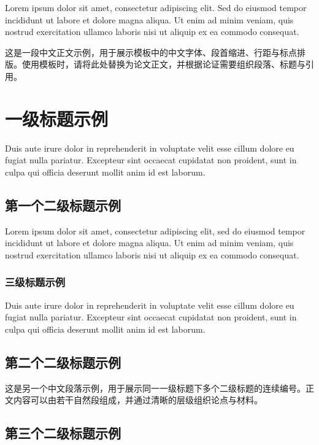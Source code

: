 \documentclass[BAhumanities,customization]{main}
\begin{document}
\hypersetup{pageanchor=false}
\makepages
\hypersetup{pageanchor=true}
\pesudohookOFpremainbody[]

Lorem ipsum dolor sit amet, consectetur adipiscing elit. Sed do eiusmod tempor incididunt ut labore et dolore magna aliqua. Ut enim ad minim veniam, quis nostrud exercitation ullamco laboris nisi ut aliquip ex ea commodo consequat.

这是一段中文正文示例，用于展示模板中的中文字体、段首缩进、行距与标点排版。使用模板时，请将此处替换为论文正文，并根据论证需要组织段落、标题与引用。

\section{一级标题示例}

Duis aute irure dolor in reprehenderit in voluptate velit esse cillum dolore eu fugiat nulla pariatur. Excepteur sint occaecat cupidatat non proident, sunt in culpa qui officia deserunt mollit anim id est laborum.

\subsection{第一个二级标题示例}

Lorem ipsum dolor sit amet, consectetur adipiscing elit, sed do eiusmod tempor incididunt ut labore et dolore magna aliqua. Ut enim ad minim veniam, quis nostrud exercitation ullamco laboris nisi ut aliquip ex ea commodo consequat.

\subsubsection{三级标题示例}

Duis aute irure dolor in reprehenderit in voluptate velit esse cillum dolore eu fugiat nulla pariatur. Excepteur sint occaecat cupidatat non proident, sunt in culpa qui officia deserunt mollit anim id est laborum.

\subsection{第二个二级标题示例}

这是另一个中文段落示例，用于展示同一一级标题下多个二级标题的连续编号。正文内容可以由若干自然段组成，并通过清晰的层级组织论点与材料。

\subsection{第三个二级标题示例}
\end{document}

